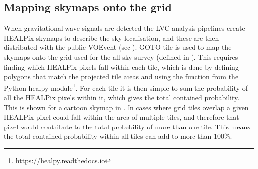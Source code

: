 \begin{colsection}
\begin{colsection}
\end{colsection}


\newpage
\subsection{Mapping skymaps onto the grid}
\label{sec:mapping_skymaps}
\begin{colsection}

When gravitational-wave signals are detected the LVC analysis pipelines create HEALPix skymaps to describe the sky localisation, and these are then distributed with the public VOEvent (see ). GOTO-tile is used to map the skymaps onto the grid used for the all-sky survey (defined in ). This requires finding which HEALPix pixels fall within each tile, which is done by defining polygons that match the projected tile areas and using the  function from the Python healpy module\footnote{\url{https://healpy.readthedocs.io}}. For each tile it is then simple to sum the probability of all the HEALPix pixels within it, which gives the total contained probability. This is shown for a cartoon skymap in . In cases where grid tiles overlap a given HEALPix pixel could fall within the area of multiple tiles, and therefore that pixel would contribute to the total probability of more than one tile. This means the total contained probability within all tiles can add to more than 100\%.


\end{colsection}
\end{colsection}
